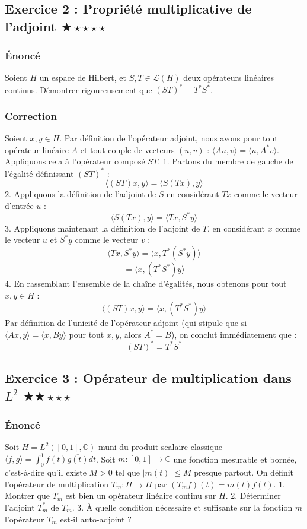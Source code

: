 \documentclass[11pt,a4paper]{article}
\begin{document}
\subsection*{Exercice 2 : Propriété multiplicative de l'adjoint $\bigstar\star\star\star\star$}
\subsubsection*{Énoncé}
Soient $H$ un espace de Hilbert, et $S, T \in \mathcal{L}(H)$ deux opérateurs linéaires continus.
Démontrer rigoureusement que $(ST)^* = T^* S^*$.

\subsubsection*{Correction}
Soient $x, y \in H$. Par définition de l'opérateur adjoint, nous avons pour tout opérateur linéaire $A$ et tout couple de vecteurs $(u, v)$ : $\langle Au, v \rangle = \langle u, A^*v \rangle$.
Appliquons cela à l'opérateur composé $ST$.
1. Partons du membre de gauche de l'égalité définissant $(ST)^*$ :
$$ \langle (ST)x, y \rangle = \langle S(Tx), y \rangle $$
2. Appliquons la définition de l'adjoint de $S$ en considérant $Tx$ comme le vecteur d'entrée $u$ :
$$ \langle S(Tx), y \rangle = \langle Tx, S^*y \rangle $$
3. Appliquons maintenant la définition de l'adjoint de $T$, en considérant $x$ comme le vecteur $u$ et $S^*y$ comme le vecteur $v$ :
$$ \langle Tx, S^*y \rangle = \langle x, T^*(S^*y) \rangle $$
$$ = \langle x, (T^*S^*)y \rangle $$
4. En rassemblant l'ensemble de la chaîne d'égalités, nous obtenons pour tout $x, y \in H$ :
$$ \langle (ST)x, y \rangle = \langle x, (T^*S^*)y \rangle $$
Par définition de l'unicité de l'opérateur adjoint (qui stipule que si $\langle Ax, y \rangle = \langle x, By \rangle$ pour tout $x,y$, alors $A^* = B$), on conclut immédiatement que :
$$ (ST)^* = T^* S^* $$


\subsection*{Exercice 3 : Opérateur de multiplication dans $L^2$ $\bigstar\bigstar\star\star\star$}
\subsubsection*{Énoncé}
Soit $H = L^2([0,1], \mathbb{C})$ muni du produit scalaire classique $\langle f, g \rangle = \int_0^1 f(t)\overline{g(t)} dt$.
Soit $m : [0,1] \to \mathbb{C}$ une fonction mesurable et bornée, c'est-à-dire qu'il existe $M > 0$ tel que $|m(t)| \le M$ presque partout.
On définit l'opérateur de multiplication $T_m : H \to H$ par $(T_m f)(t) = m(t)f(t)$.
1. Montrer que $T_m$ est bien un opérateur linéaire continu sur $H$.
2. Déterminer l'adjoint $T_m^*$ de $T_m$.
3. À quelle condition nécessaire et suffisante sur la fonction $m$ l'opérateur $T_m$ est-il auto-adjoint ?
\end{document}
